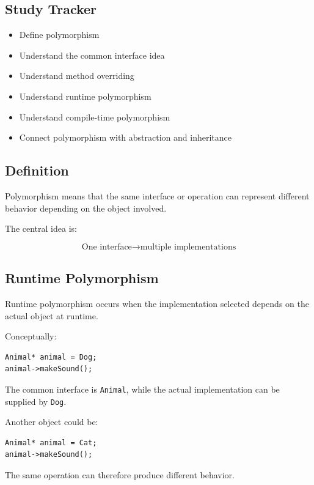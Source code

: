 \documentclass[11pt,a4paper]{article}
\newcommand{\checkitem}{$\square$}
\begin{document}
\subsection{Study Tracker}

\begin{itemize}[label=\checkitem]
    \item Define polymorphism
    \item Understand the common interface idea
    \item Understand method overriding
    \item Understand runtime polymorphism
    \item Understand compile-time polymorphism
    \item Connect polymorphism with abstraction and inheritance
\end{itemize}

\subsection{Definition}

Polymorphism means that the same interface or operation can represent
different behavior depending on the object involved.

The central idea is:

\[
\boxed{\text{One interface} \rightarrow \text{multiple implementations}}
\]

\subsection{Runtime Polymorphism}

Runtime polymorphism occurs when the implementation selected depends on the
actual object at runtime.

Conceptually:

\begin{verbatim}
Animal* animal = Dog;
animal->makeSound();
\end{verbatim}

The common interface is \texttt{Animal}, while the actual implementation
can be supplied by \texttt{Dog}.

Another object could be:

\begin{verbatim}
Animal* animal = Cat;
animal->makeSound();
\end{verbatim}

The same operation can therefore produce different behavior.
\end{document}
